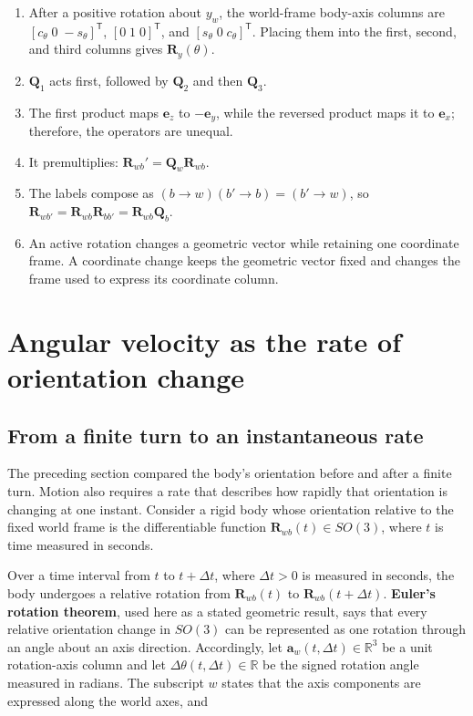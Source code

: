\documentclass[
  australian,
  12pt,
  letterpaper,
  DIV=11,
  numbers=noendperiod,
  twoside]{scrreprt}
\providecommand{\tightlist}{%
  \setlength{\itemsep}{0pt}\setlength{\parskip}{0pt}}
\begin{document}
\begin{enumerate}
\def\labelenumi{\arabic{enumi}.}
\tightlist
\item
  After a positive rotation about \(y_w\), the world-frame body-axis
  columns are \([c_\theta\;0\;-s_\theta]^\mathsf T\),
  \([0\;1\;0]^\mathsf T\), and \([s_\theta\;0\;c_\theta]^\mathsf T\).
  Placing them into the first, second, and third columns gives
  \(\mathbf R_y(\theta)\).
\item
  \(\mathbf Q_1\) acts first, followed by \(\mathbf Q_2\) and then
  \(\mathbf Q_3\).
\item
  The first product maps \(\mathbf e_z\) to \(-\mathbf e_y\), while the
  reversed product maps it to \(\mathbf e_x\); therefore, the operators
  are unequal.
\item
  It premultiplies: \(\mathbf R_{wb}'=\mathbf Q_w\mathbf R_{wb}\).
\item
  The labels compose as
  \((b\rightarrow w)(b'\rightarrow b)=(b'\rightarrow w)\), so
  \(\mathbf R_{wb'}=\mathbf R_{wb}\mathbf R_{bb'}=\mathbf R_{wb}\mathbf Q_b\).
\item
  An active rotation changes a geometric vector while retaining one
  coordinate frame. A coordinate change keeps the geometric vector fixed
  and changes the frame used to express its coordinate column.
\end{enumerate}

\section{Angular velocity as the rate of orientation
change}\label{sec-so3-angular-velocity}

\subsection{From a finite turn to an instantaneous
rate}\label{sec-so3-angular-velocity-definition}

The preceding section compared the body's orientation before and after a
finite turn. Motion also requires a rate that describes how rapidly that
orientation is changing at one instant. Consider a rigid body whose
orientation relative to the fixed world frame is the differentiable
function \(\mathbf R_{wb}(t)\in SO(3)\), where \(t\) is time measured in
seconds.

Over a time interval from \(t\) to \(t+\Delta t\), where \(\Delta t>0\)
is measured in seconds, the body undergoes a relative rotation from
\(\mathbf R_{wb}(t)\) to \(\mathbf R_{wb}(t+\Delta t)\). \textbf{Euler's
rotation theorem}, used here as a stated geometric result, says that
every relative orientation change in \(SO(3)\) can be represented as one
rotation through an angle about an axis direction. Accordingly, let
\(\mathbf a_w(t,\Delta t)\in\mathbb R^3\) be a unit rotation-axis column
and let \(\Delta\theta(t,\Delta t)\in\mathbb R\) be the signed rotation
angle measured in radians. The subscript \(w\) states that the axis
components are expressed along the world axes, and
\end{document}
